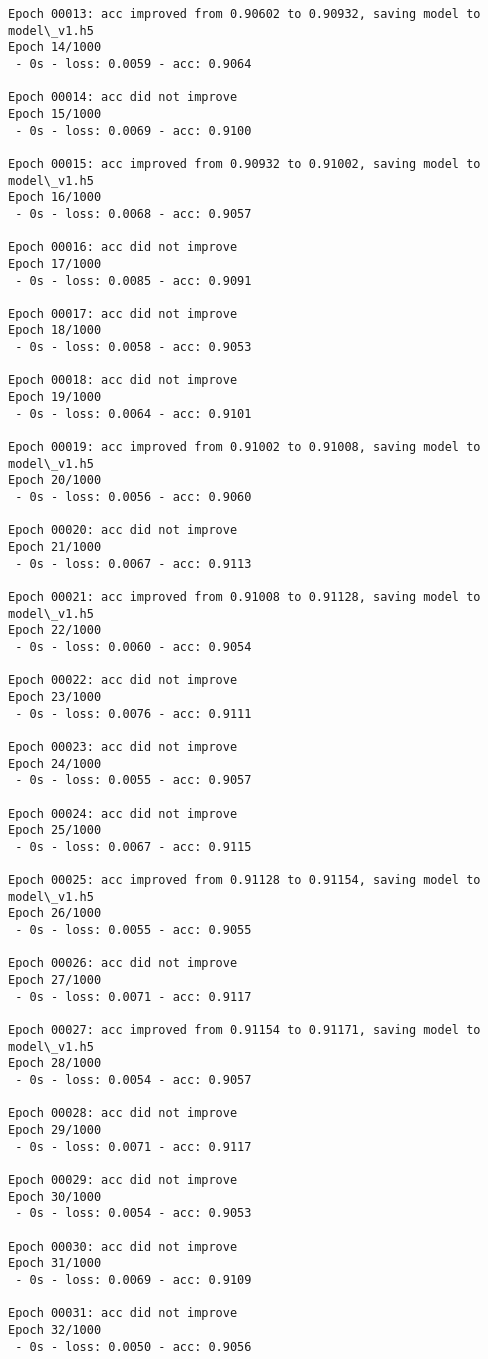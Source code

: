 \documentclass[11pt]{article}
\begin{document}
\begin{Verbatim}[commandchars=\\\{\}]
Epoch 00013: acc improved from 0.90602 to 0.90932, saving model to model\_v1.h5
Epoch 14/1000
 - 0s - loss: 0.0059 - acc: 0.9064

Epoch 00014: acc did not improve
Epoch 15/1000
 - 0s - loss: 0.0069 - acc: 0.9100

Epoch 00015: acc improved from 0.90932 to 0.91002, saving model to model\_v1.h5
Epoch 16/1000
 - 0s - loss: 0.0068 - acc: 0.9057

Epoch 00016: acc did not improve
Epoch 17/1000
 - 0s - loss: 0.0085 - acc: 0.9091

Epoch 00017: acc did not improve
Epoch 18/1000
 - 0s - loss: 0.0058 - acc: 0.9053

Epoch 00018: acc did not improve
Epoch 19/1000
 - 0s - loss: 0.0064 - acc: 0.9101

Epoch 00019: acc improved from 0.91002 to 0.91008, saving model to model\_v1.h5
Epoch 20/1000
 - 0s - loss: 0.0056 - acc: 0.9060

Epoch 00020: acc did not improve
Epoch 21/1000
 - 0s - loss: 0.0067 - acc: 0.9113

Epoch 00021: acc improved from 0.91008 to 0.91128, saving model to model\_v1.h5
Epoch 22/1000
 - 0s - loss: 0.0060 - acc: 0.9054

Epoch 00022: acc did not improve
Epoch 23/1000
 - 0s - loss: 0.0076 - acc: 0.9111

Epoch 00023: acc did not improve
Epoch 24/1000
 - 0s - loss: 0.0055 - acc: 0.9057

Epoch 00024: acc did not improve
Epoch 25/1000
 - 0s - loss: 0.0067 - acc: 0.9115

Epoch 00025: acc improved from 0.91128 to 0.91154, saving model to model\_v1.h5
Epoch 26/1000
 - 0s - loss: 0.0055 - acc: 0.9055

Epoch 00026: acc did not improve
Epoch 27/1000
 - 0s - loss: 0.0071 - acc: 0.9117

Epoch 00027: acc improved from 0.91154 to 0.91171, saving model to model\_v1.h5
Epoch 28/1000
 - 0s - loss: 0.0054 - acc: 0.9057

Epoch 00028: acc did not improve
Epoch 29/1000
 - 0s - loss: 0.0071 - acc: 0.9117

Epoch 00029: acc did not improve
Epoch 30/1000
 - 0s - loss: 0.0054 - acc: 0.9053

Epoch 00030: acc did not improve
Epoch 31/1000
 - 0s - loss: 0.0069 - acc: 0.9109

Epoch 00031: acc did not improve
Epoch 32/1000
 - 0s - loss: 0.0050 - acc: 0.9056


\end{Verbatim}
\end{document}
